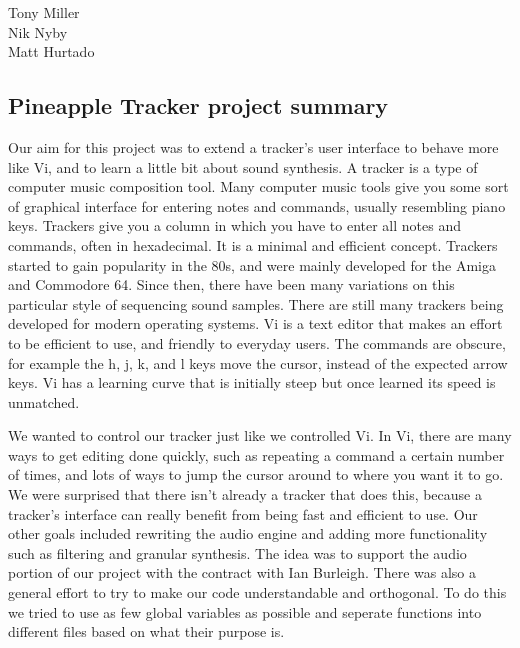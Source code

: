 \documentclass[12pt,letterpaper]{article}
\begin{document}
\begin{flushright}
Tony Miller\\
Nik Nyby\\
Matt Hurtado
\end{flushright}

\begin{center}
\section*{Pineapple Tracker project summary}
\end{center}


\doublespacing

\par
Our aim for this project was to extend a tracker's user interface to behave more like Vi, and to learn a little bit about sound synthesis. A tracker is a type of computer music composition tool. Many computer music tools give you some sort of graphical interface for entering notes and commands, usually resembling piano keys. Trackers give you a column in which you have to enter all notes and commands, often in hexadecimal. It is a minimal and efficient concept. Trackers started to gain popularity in the 80s, and were mainly developed for the Amiga and Commodore 64. Since then, there have been many variations on this particular style of sequencing sound samples. There are still many trackers being developed for modern operating systems. Vi is a text editor that makes an effort to be efficient to use, and friendly to everyday users. The commands are obscure, for example the h, j, k, and l keys move the cursor, instead of the expected arrow keys. Vi has a learning curve that is initially steep but once learned its speed is unmatched. %

\par
We wanted to control our tracker just like we controlled Vi. In Vi, there are many ways to get editing done quickly, such as repeating a command a certain number of times, and lots of ways to jump the cursor around to where you want it to go. We were surprised that there isn't already a tracker that does this, because a tracker's interface can really benefit from being fast and efficient to use. Our other goals included rewriting the audio engine and adding more functionality such as filtering and granular synthesis. The idea was to support the audio portion of our project with the contract with Ian Burleigh. There was also a general effort to try to make our code understandable and orthogonal. To do this we tried to use as few global variables as possible and seperate functions into different files based on what their purpose is.
\end{document}
